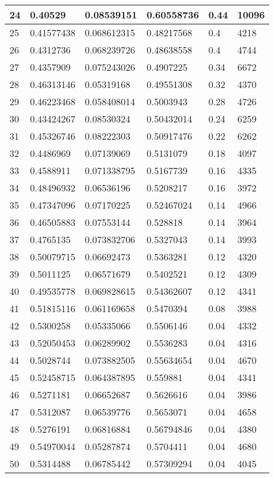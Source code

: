 \begin{longtable}{|l|l|l|l|l|l|}
24 & 0.40529 & 0.08539151 & 0.60558736 & 0.44 & 10096 \\ \hline 
25 & 0.41577438 & 0.068612315 & 0.48217568 & 0.4 & 4218 \\ \hline 
26 & 0.4312736 & 0.068239726 & 0.48638558 & 0.4 & 4744 \\ \hline 
27 & 0.4357909 & 0.075243026 & 0.4907225 & 0.34 & 6672 \\ \hline 
28 & 0.46313146 & 0.05319168 & 0.49551308 & 0.32 & 4370 \\ \hline 
29 & 0.46223468 & 0.058408014 & 0.5003943 & 0.28 & 4726 \\ \hline 
30 & 0.43424267 & 0.08530324 & 0.50432014 & 0.24 & 6259 \\ \hline 
31 & 0.45326746 & 0.08222303 & 0.50917476 & 0.22 & 6262 \\ \hline 
32 & 0.4486969 & 0.07139069 & 0.5131079 & 0.18 & 4097 \\ \hline 
33 & 0.4588911 & 0.071338795 & 0.5167739 & 0.16 & 4335 \\ \hline 
34 & 0.48496932 & 0.06536196 & 0.5208217 & 0.16 & 3972 \\ \hline 
35 & 0.47347096 & 0.07170225 & 0.52467024 & 0.14 & 4966 \\ \hline 
36 & 0.46505883 & 0.07553144 & 0.528818 & 0.14 & 3964 \\ \hline 
37 & 0.4765135 & 0.073832706 & 0.5327043 & 0.14 & 3993 \\ \hline 
38 & 0.50079715 & 0.06692473 & 0.5363281 & 0.12 & 4320 \\ \hline 
39 & 0.5011125 & 0.06571679 & 0.5402521 & 0.12 & 4309 \\ \hline 
40 & 0.49535778 & 0.069828615 & 0.54362607 & 0.12 & 4341 \\ \hline 
41 & 0.51815116 & 0.061169658 & 0.5470394 & 0.08 & 3988 \\ \hline 
42 & 0.5300258 & 0.05335066 & 0.5506146 & 0.04 & 4332 \\ \hline 
43 & 0.52050453 & 0.06289902 & 0.5536283 & 0.04 & 4316 \\ \hline 
44 & 0.5028744 & 0.073882505 & 0.55634654 & 0.04 & 4670 \\ \hline 
45 & 0.52458715 & 0.064387895 & 0.559881 & 0.04 & 4341 \\ \hline 
46 & 0.5271181 & 0.06652687 & 0.5626616 & 0.04 & 3986 \\ \hline 
47 & 0.5312087 & 0.06539776 & 0.5653071 & 0.04 & 4658 \\ \hline 
48 & 0.5276191 & 0.06816884 & 0.56794846 & 0.04 & 4380 \\ \hline 
49 & 0.54970044 & 0.05287874 & 0.5704411 & 0.04 & 4680 \\ \hline 
50 & 0.5314488 & 0.06785442 & 0.57309294 & 0.04 & 4045 \\ \hline 
\end{longtable}